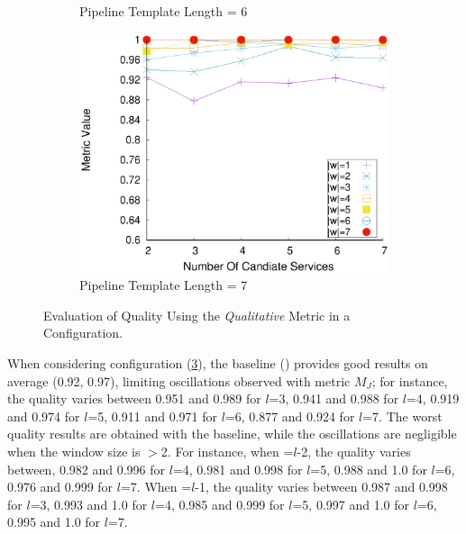 \begin{figure}[ht!]
\begin{subfigure}{0.49\textwidth}
        \caption{Pipeline Template Length = 6}
        \label{fig:quality_window_wide_qualitative_n6}
      \end{subfigure}
      \hfill
      \begin{subfigure}{0.49\textwidth}
        \includegraphics[width=\textwidth]{Images/graphs/window_quality_performance_diff_qual_n7_s7_20_100_n7}
        \caption{Pipeline Template Length = 7}
        \label{fig:quality_window_wide_qualitative_n7}
      \end{subfigure}


      \caption{Evaluation of Quality Using the \emph{Qualitative} Metric in a \wide Configuration.}  \label{fig:quality_window_qualitative_wide}
    \end{figure}

    When considering configuration \wide (\cref{fig:quality_window_qualitative_wide}), the baseline () provides good results on average (0.92, 0.97), limiting oscillations observed with metric $M_J$; for instance, the quality varies between 0.951 and 0.989 for $l$=3, 0.941 and 0.988 for $l$=4, 0.919 and 0.974 for $l$=5, 0.911 and 0.971 for $l$=6, 0.877 and 0.924 for $l$=7.
    The worst quality results are obtained with the baseline, while the oscillations are negligible when the window size is $>$2. For instance, when \windowsize=$l$-2, the quality varies between, 0.982 and 0.996 for $l$=4, 0.981 and 0.998 for $l$=5, 0.988 and 1.0 for $l$=6, 0.976 and 0.999 for $l$=7. When \windowsize=$l$-1, the quality varies between  0.987 and  0.998 for $l$=3, 0.993 and 1.0 for $l$=4, 0.985 and 0.999 for $l$=5, 0.997 and 1.0 for $l$=6, 0.995 and 1.0  for $l$=7.


